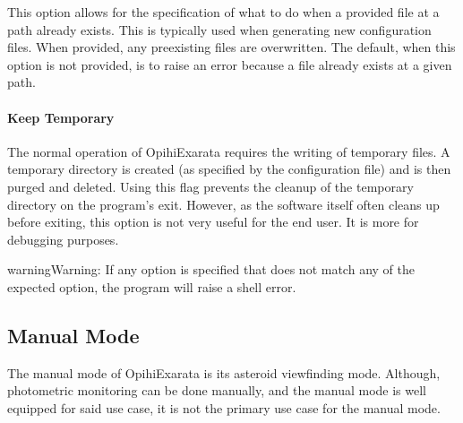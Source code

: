 \documentclass[letterpaper,11pt,english]{sphinxmanual}
\begin{document}
\sphinxAtStartPar
This option allows for the specification of what to do when a provided
file at a path already exists. This is typically used when generating new
configuration files. When provided, any pre\sphinxhyphen{}existing files are overwritten.
The default, when this option is not provided, is to raise an error because a
file already exists at a given path.


\paragraph{Keep Temporary}
\label{\detokenize{user/command_line:keep-temporary}}

\begin{savenotes}\begin{fulllineitems}
\label{\detokenize{user/command_line:cmdoption-keep-temporary}}
\pysigstartsignatures
{}
\pysigstopsignatures
\end{fulllineitems}\end{savenotes}


\sphinxAtStartPar
The normal operation of OpihiExarata requires the writing of temporary files.
A temporary directory is created (as specified by the configuration file) and
is then purged and deleted. Using this flag prevents the cleanup of the
temporary directory on the program’s exit. However, as the software itself often
cleans up before exiting, this option is not very useful for the end user. It
is more for debugging purposes.

\begin{sphinxadmonition}{warning}{Warning:}
\sphinxAtStartPar
If any option is specified that does not match any of the expected option,
the program will raise a shell error.
\end{sphinxadmonition}

\sphinxstepscope


\subsection{Manual Mode}
\label{\detokenize{user/manual_mode:manual-mode}}\label{\detokenize{user/manual_mode:user-manual-mode}}\label{\detokenize{user/manual_mode::doc}}
\sphinxAtStartPar
The manual mode of OpihiExarata is its asteroid view\sphinxhyphen{}finding mode. Although,
photometric monitoring can be done manually, and the manual mode is well
equipped for said use case, it is not the primary use case for the manual mode.
\end{document}
